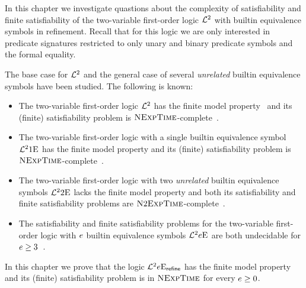 In this chapter we investigate quastions about the complexity of satisfiability
and finite satisfiability of the two-variable first-order logic $\mathcal{L}^{2}$ with
builtin equivalence symbols in refinement. Recall that for this logic we are
only interested in predicate signatures restricted to only unary and binary
predicate symbols and the formal equality.

The base case for $\mathcal{L}^{2}$ and the general case of several \emph{unrelated}
builtin equivalence symbols have been studied. The following is known:
\begin{itemize}
  \item The two-variable first-order logic $\mathcal{L}^{2}$ has the finite model
  property~\cite{MALQ:MALQ19750210118} and its (finite) satisfiability problem
  is $\text{\normalfont{\scshape NExpTime}}$-complete~\cite{gradel1997decision}.
  \item The two-variable first-order logic with a single builtin equivalence
  symbol $\mathcal{L}^{2}{1}\mathrm{E}_{{}}$ has the finite model property and its (finite)
  satisfiability problem is $\text{\normalfont{\scshape NExpTime}}$-complete~\cite{kieronski2005results}.
  \item The two-variable first-order logic with two \emph{unrelated} builtin
  equivalence symbols $\mathcal{L}^{2}{2}\mathrm{E}_{{}}$ lacks the finite model property and both
  its satisfiability and finite satisfiability problems are
  $\text{\normalfont{\scshape N}}2\text{\normalfont{\scshape ExpTime}}$-complete~\cite{doi:10.1137/120900095}.
  \item The satisfiability and finite satisfiability problems for
  the two-variable first-order logic with $e$ builtin equivalence symbols
  $\mathcal{L}^{2}{e}\mathrm{E}_{{}}$ are both undecidable for $e \geq
  3$~\cite{kieronski2005small}.
\end{itemize}

In this chapter we prove that the logic $\mathcal{L}^{2}{e}\mathrm{E}_{\mathsf{refine}}$ has the finite
model property and its (finite) satisfiability problem is in $\text{\normalfont{\scshape NExpTime}}$ for
every $e \geq 0$.
